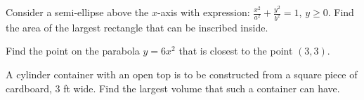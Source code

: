\documentclass[Calculus 1 Recitation.tex]{subfiles}
\begin{document}
\begin{myleftlinebox}
	Consider a semi-ellipse above the $x$-axis with expression: $\frac{x^2}{a^2}+\frac{y^2}{b^2}=1$, $y\geq 0$. Find the area of the largest rectangle that can be inscribed inside.
	\tcblower
	\vspace{2em}
\end{myleftlinebox}

\begin{myleftlinebox}
	Find the point on the parabola $y=6x^2$ that is closest to the point $(3,3)$.
	\tcblower
	\vspace{2em}
\end{myleftlinebox}

\begin{myleftlinebox}
	A cylinder container with an open top is to be constructed from a square piece of cardboard, 3 ft wide. Find the largest volume that such a container can have.
	\tcblower
	\vspace{2em}
\end{myleftlinebox}
\end{document}

